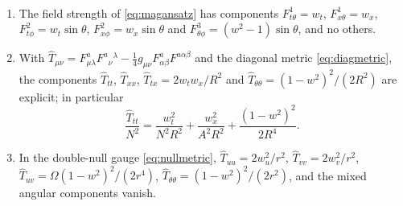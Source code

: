 \begin{theorem}\label{thm:ymstress}\ver\
\begin{enumerate}[label=(\roman*)]
\item The field strength of \eqref{eq:magansatz} has components $F^1_{t\theta}=w_t$, $F^1_{x\theta}=w_x$, $F^2_{t\phi}=w_t\sin\theta$, $F^2_{x\phi}=w_x\sin\theta$ and $F^3_{\theta\phi}=(w^2-1)\sin\theta$, and no others.
\item With $\hat T_{\mu\nu}=F^a_{\mu\lambda}F^{a}{}_\nu{}^\lambda-\frac14g_{\mu\nu}F^a_{\alpha\beta}F^{a\alpha\beta}$ and the diagonal metric \eqref{eq:diagmetric}, the components $\hat T_{tt}$, $\hat T_{xx}$, $\hat T_{tx}=2w_tw_x/R^2$ and $\hat T_{\theta\theta}=(1-w^2)^2/(2R^2)$ are explicit; in particular
\[
\frac{\hat T_{tt}}{N^2}=\frac{w_t^2}{N^2R^2}+\frac{w_x^2}{A^2R^2}+\frac{(1-w^2)^2}{2R^4}.
\]
\item In the double-null gauge \eqref{eq:nullmetric}, $\hat T_{uu}=2w_u^2/r^2$, $\hat T_{vv}=2w_v^2/r^2$, $\hat T_{uv}=\Omega(1-w^2)^2/(2r^4)$, $\hat T_{\theta\theta}=(1-w^2)^2/(2r^2)$, and the mixed angular components vanish.
\end{enumerate}
\end{theorem}
